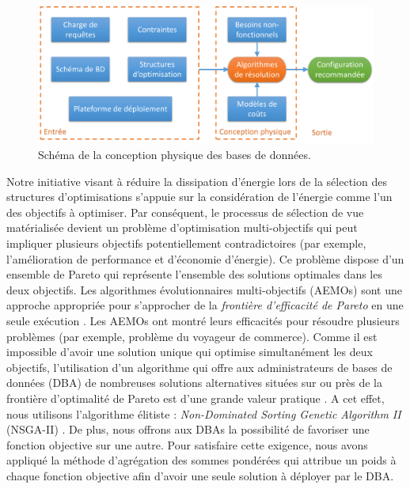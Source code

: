 \begin{figure}
	\begin{center}
		\includegraphics[scale=0.6]{chapitre6/chap6Fig/physical-design.pdf}
		\caption{Schéma de la conception physique des bases de données.}
		\label{fig:physical-design}
	\end{center}
\end{figure}

Notre initiative visant à réduire la dissipation d'énergie lors de la sélection des structures d'optimisations s'appuie sur la considération de l'énergie comme l'un des objectifs à optimiser. Par conséquent, le processus de sélection de vue matérialisée devient un problème d'optimisation multi-objectifs qui peut impliquer plusieurs objectifs potentiellement contradictoires (par exemple, l'amélioration de performance et d'économie d'énergie). Ce problème dispose d'un ensemble de Pareto \cite{Zhou2011} qui représente l'ensemble des solutions optimales dans les deux objectifs. Les algorithmes évolutionnaires multi-objectifs (AEMOs) sont une approche appropriée pour s'approcher de la \textit{frontière d'efficacité de Pareto} en une seule exécution \cite{Zhou2011}. Les AEMOs ont montré leurs efficacités pour résoudre plusieurs problèmes (par exemple, problème du voyageur de commerce). Comme il est impossible d'avoir une solution unique qui optimise simultanément les deux objectifs, l'utilisation d'un algorithme qui offre aux administrateurs de bases de données (DBA) de nombreuses solutions alternatives situées sur ou près de la frontière d'optimalité de Pareto est d'une grande valeur pratique \cite{Deb02}. A cet effet, nous utilisons l'algorithme élitiste : \textit{Non-Dominated Sorting Genetic Algorithm II} (NSGA-II) \cite{Deb02}. De plus, nous offrons aux DBAs la possibilité de favoriser une fonction objective sur une autre. Pour satisfaire cette exigence, nous avons appliqué la méthode d'agrégation des sommes pondérées qui attribue un poids à chaque fonction objective afin d'avoir une seule solution à déployer par le DBA.

